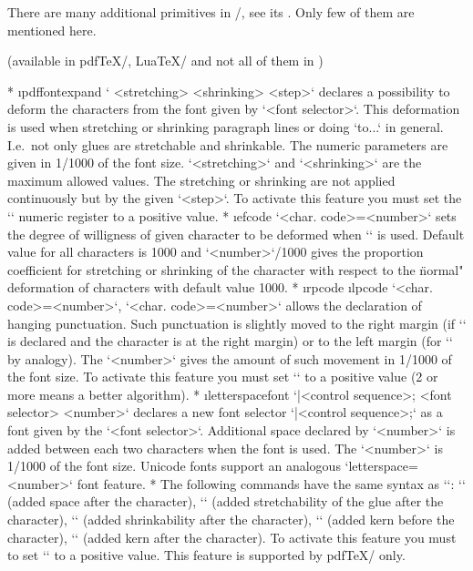 {There are many additional primitives in \LuaTeX/, see its
.
Only few of them are mentioned here.
\medskip

(available in pdf\TeX/, Lua\TeX/ and not all of them in \XeTeX)

\begitems
* \i pdffontexpand 
  ` <stretching> <shrinking> <step>`
  declares a possibility to deform the characters from the font given by
  `<font selector>`. This deformation is used when stretching or shrinking
  paragraph lines or doing `\hbox to{...}` in general. I.e.\ not only glues are
  stretchable and shrinkable. The numeric parameters are given in 1/1000
  of the font size. `<stretching>` and `<shrinking>` are the maximum allowed
  values. The stretching or shrinking are not applied continuously but by
  the given `<step>`.
  To activate this feature you must set the \x`\pdfadjustspacing`
  numeric register to a positive value. 
* \i efcode `<char. code>=<number>`
  sets the degree of willigness of given character to be deformed when
  `\pdffontexpand` is used. Default value for all
  characters is 1000 and `<number>`/1000 gives the proportion coefficient for
  stretching or shrinking of the character with respect to the \"normal" deformation
  of characters with default value 1000.
* \i rpcode \i lpcode 
  `<char. code>=<number>`,
  `<char. code>=<number>` allows the declaration of
  hanging punctuation. Such punctuation is slightly moved to the right
  margin (if `\rpcode` is declared and the character is at the right margin) 
  or to the left margin (for `\lpcode` by analogy).
  The `<number>` gives the amount of such movement in 1/1000 of the font size.
  To activate this feature you must set \x`\pdfprotrudechars` to
  a positive value (2 or more means a better algorithm).
* \i letterspacefont
  ` |<control sequence>; <font selector> <number>`
  declares a new font selector `|<control sequence>;` as a font given by
  the `<font selector>`. Additional space declared by `<number>` is added
  between each two characters when the font is used. The `<number>` is 1/1000 of
  the font size. Unicode fonts support an analogous
  `letterspace=<number>` font feature. 
* The following commands have the same syntax as `\rpcode`:
  \x`\knbscode` (added space after the character),
  \x`\stbscode` (added stretchability of the glue after the character),
  \x`\shbscode` (added shrinkability after the character),
  \x`\knbccode` (added kern before the character),
  \x`\knaccode` (added kern after the character).
  To activate this feature you must to set
  \x`\pdfadjustinterwordglue` to a positive value.
  This feature is supported by pdf\TeX/ only.
\enditems

}

